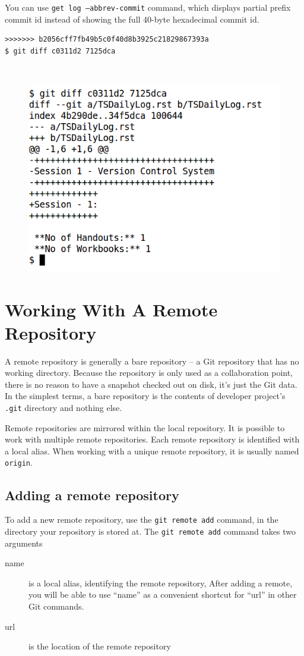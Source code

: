 \documentclass[11pt,a4paper]{article}
\begin{document}
You can use \texttt{get log --abbrev-commit} command, which displays partial prefix commit id instead of showing the full 40-byte hexadecimal commit id.
\begin{verbatim}
>>>>>>> b2056cff7fb49b5c0f40d8b3925c21829867393a 
$ git diff c0311d2 7125dca
\end{verbatim}
\vfill{\ }
\begin{figure}[H]
    \begin{center}
        \includegraphics[scale=0.4]{diff1.png}       
       \end{center}
    \end{figure}
\section*{Working With A Remote Repository}
A remote repository is generally a bare repository – a Git repository that has no working directory. Because the repository is only used as a collaboration
point, there is no reason to have a snapshot checked out on disk, it's just the Git data. In the simplest terms, a bare repository is the contents of developer
project's \texttt{.git} directory and nothing else.

Remote repositories are mirrored within the local repository.  It is possible to work with multiple remote repositories. Each remote repository is identified with a local alias. When working with a unique remote repository, it is usually named \texttt{origin}.

\subsection*{Adding a remote repository}
To add a new remote repository, use the \texttt{git remote add} command, in the directory your repository is stored at.
The \texttt{git remote add} command takes two arguments
\begin{description}
\item [name] is a local alias, identifying the remote repository, After adding a remote, you will be able to use ``name'' as a convenient shortcut for ``url'' in other Git commands.
\item [url] is the location of the remote repository
\end{description}
\end{document}
